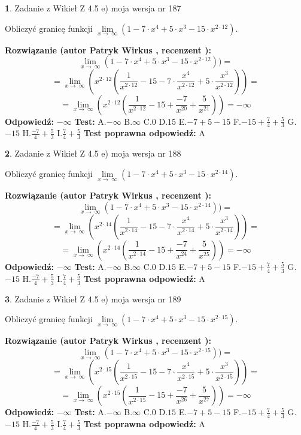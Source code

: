 \documentclass[12pt, a4paper]{article}
\theoremstyle{definition} %
\newtheorem{zad}{}
\newcommand{\zadStart}[1]{\begin{zad}#1\newline}
\newcommand{\zadStop}{\end{zad}}
\newcommand{\rozwStart}[2]{\noindent \textbf{Rozwiązanie (autor #1 , recenzent #2): }\newline}
\newcommand{\rozwStop}{\newline}
\newcommand{\odpStart}{\noindent \textbf{Odpowiedź:}\newline}
\newcommand{\odpStop}{\newline}
\newcommand{\testStart}{\noindent \textbf{Test:}\newline}
\newcommand{\testStop}{\newline}
\newcommand{\kluczStart}{\noindent \textbf{Test poprawna odpowiedź:}\newline}
\newcommand{\kluczStop}{\newline}
\begin{document}
\zadStart{Zadanie z Wikieł Z 4.5 e) moja wersja nr 187}



Obliczyć granicę funkcji  $\lim\limits_{x\to\ \infty}(1 - 7 \cdot x^{4}+5 \cdot x^{3}- 15 \cdot x^{2\cdot12})$.
\zadStop
\rozwStart{Patryk Wirkus}{}
$$\lim\limits_{x\to\ \infty}(1 - 7 \cdot x^{4}+5 \cdot x^{3}- 15 \cdot x^{2\cdot12}))=$$
$$=\lim\limits_{x\to\ \infty}(x^{2\cdot12}(\frac{1}{x^{2\cdot12}}-15 -7 \cdot \frac{x^{4}}{x^{2\cdot12}}+5 \cdot \frac{x^{3}}{x^{2\cdot12}}))=$$
$$=\lim\limits_{x\to\ \infty}(x^{2\cdot12}(\frac{1}{x^{2\cdot12}}-15 + \frac{-7}{x^{20}}+ \frac{5}{x^{21}}))=-\infty$$
\rozwStop
\odpStart
$-\infty$
\odpStop
\testStart
A.$-\infty$ B.$\infty$ C.$0$ D.$15$ E.$-7 + 5 - 15$
F.$-15+\frac{7}{4}+\frac{5}{3}$ G.$-15$
H.$\frac{-7}{4}+\frac{5}{3}$
I.$\frac{7}{4}+\frac{5}{3}$
\testStop
\kluczStart
A
\kluczStop



\zadStart{Zadanie z Wikieł Z 4.5 e) moja wersja nr 188}



Obliczyć granicę funkcji  $\lim\limits_{x\to\ \infty}(1 - 7 \cdot x^{4}+5 \cdot x^{3}- 15 \cdot x^{2\cdot14})$.
\zadStop
\rozwStart{Patryk Wirkus}{}
$$\lim\limits_{x\to\ \infty}(1 - 7 \cdot x^{4}+5 \cdot x^{3}- 15 \cdot x^{2\cdot14}))=$$
$$=\lim\limits_{x\to\ \infty}(x^{2\cdot14}(\frac{1}{x^{2\cdot14}}-15 -7 \cdot \frac{x^{4}}{x^{2\cdot14}}+5 \cdot \frac{x^{3}}{x^{2\cdot14}}))=$$
$$=\lim\limits_{x\to\ \infty}(x^{2\cdot14}(\frac{1}{x^{2\cdot14}}-15 + \frac{-7}{x^{24}}+ \frac{5}{x^{25}}))=-\infty$$
\rozwStop
\odpStart
$-\infty$
\odpStop
\testStart
A.$-\infty$ B.$\infty$ C.$0$ D.$15$ E.$-7 + 5 - 15$
F.$-15+\frac{7}{4}+\frac{5}{3}$ G.$-15$
H.$\frac{-7}{4}+\frac{5}{3}$
I.$\frac{7}{4}+\frac{5}{3}$
\testStop
\kluczStart
A
\kluczStop



\zadStart{Zadanie z Wikieł Z 4.5 e) moja wersja nr 189}



Obliczyć granicę funkcji  $\lim\limits_{x\to\ \infty}(1 - 7 \cdot x^{4}+5 \cdot x^{3}- 15 \cdot x^{2\cdot15})$.
\zadStop
\rozwStart{Patryk Wirkus}{}
$$\lim\limits_{x\to\ \infty}(1 - 7 \cdot x^{4}+5 \cdot x^{3}- 15 \cdot x^{2\cdot15}))=$$
$$=\lim\limits_{x\to\ \infty}(x^{2\cdot15}(\frac{1}{x^{2\cdot15}}-15 -7 \cdot \frac{x^{4}}{x^{2\cdot15}}+5 \cdot \frac{x^{3}}{x^{2\cdot15}}))=$$
$$=\lim\limits_{x\to\ \infty}(x^{2\cdot15}(\frac{1}{x^{2\cdot15}}-15 + \frac{-7}{x^{26}}+ \frac{5}{x^{27}}))=-\infty$$
\rozwStop
\odpStart
$-\infty$
\odpStop
\testStart
A.$-\infty$ B.$\infty$ C.$0$ D.$15$ E.$-7 + 5 - 15$
F.$-15+\frac{7}{4}+\frac{5}{3}$ G.$-15$
H.$\frac{-7}{4}+\frac{5}{3}$
I.$\frac{7}{4}+\frac{5}{3}$
\testStop
\kluczStart
A
\kluczStop
\end{document}
